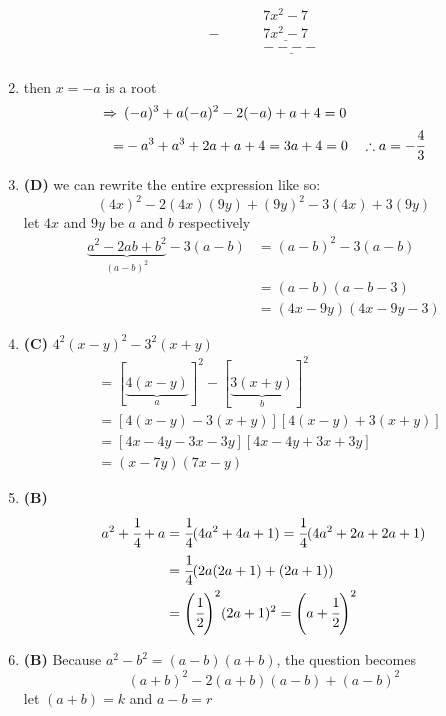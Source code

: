 \begin{multicols}{2}
\begin{enumerate}[label={\textbf{\arabic*.}}]
\begin{align*}
& \hspace{28pt} 7x^2 - 7 \\
-& \hspace{28pt} \underline{7x^2 - 7} \\
& \hspace{28pt} \underline{----} \\
\end{align*}
\item then $x = -a$ is a root
\begin{align*}
\Rightarrow \hspace{5pt} &(-a)^3 + a(-a)^2 - 2(-a) + a + 4  = 0\\
= &-a^3 + a^3 + 2a + a + 4 = 3a + 4 = 0 \hspace{10pt} \therefore a = -\cfrac{4}{3}
\end{align*}
\item \textbf{(D)} we can rewrite the entire expression like so: \vspace{-5pt}
$$(4x)^2 - 2(4x)(9y) + (9y)^2 - 3(4x) + 3(9y)$$
let $4x$ and $9y$ be $a$ and $b$ respectively \\
\begin{align*}
\underbrace{a^2 -2ab +b^2}_{(a-b)^2} -3(a - b) &= (a-b)^2 -3(a-b) \\
& = (a-b)(a-b -3) \\
& = (4x - 9y)(4x - 9y - 3)
\end{align*}
\item \textbf{(C)}  $4^2 (x-y)^2 - 3^2(x+y)$
\begin{align*}
& = [\underbrace{4(x-y)}_{a}]^2 -[\underbrace {3(x+y)}_{b}]^2 \\
& = \left[4(x-y) -3(x+y)\right]\left[4(x-y) + 3(x+y)\right] \\
& = \left[4x - 4y -3x - 3y\right]\left[4x - 4y + 3x +  3y\right] \\
& = (x - 7y)(7x -y)
\end{align*}
\item \textbf{(B)}
\begin{align*}
a^2 + \cfrac{1}{4} + a &=\cfrac{1}{4}(4a^2 + 4a + 1) = \cfrac{1}{4}(4a^2 + 2a + 2a + 1) \\
& = \cfrac{1}{4} (2a(2a + 1) + (2a+1)) \\
&= {\left( \cfrac{1}{2} \right)}^2 (2a+1)^2 = {\left(a + \cfrac{1}{2}\right)}^2
\end{align*}
\item \textbf{(B)} Because $a^2 - b^2 = (a-b)(a+b)$, the question becomes
\[(a+b)^2 -2(a+b)(a-b) + (a-b)^2\]
let $(a+b) = k$ and $a-b = r$

\end{enumerate}
\end{multicols}
